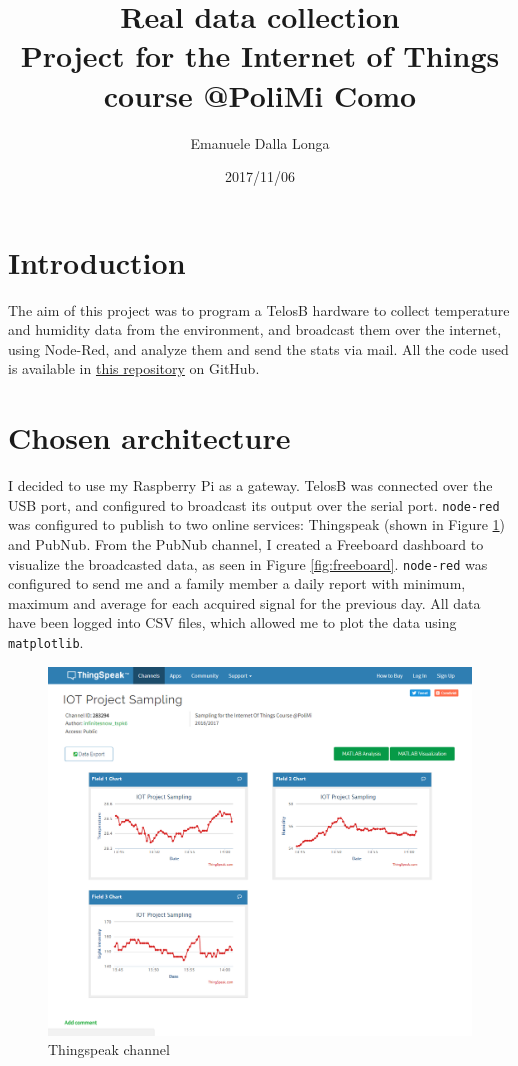 \documentclass[11pt]{article}
\title{\textbf{Real data collection}\\
				\large Project for the Internet of Things course @PoliMi Como}
\author{Emanuele Dalla Longa}
\date{2017/11/06}
\begin{document}
\maketitle

\section{Introduction}
The aim of this project was to program a TelosB hardware to collect temperature and humidity data from the environment, and broadcast them over the internet, using Node-Red, and analyze them and send the stats via mail. All the code used is available in \href{https://github.com/infinitesnow/IOT2016}{this repository} on GitHub.

\section{Chosen architecture}
I decided to use my Raspberry Pi as a gateway. TelosB was connected over the USB port, and configured to broadcast its output over the serial port. \texttt{node-red} was configured to publish to two online services: Thingspeak (shown in Figure \ref{fig:thingspeak}) and PubNub. From the PubNub channel, I created a Freeboard dashboard to visualize the broadcasted data, as seen in Figure \ref{fig:freeboard}. \texttt{node-red} was configured to send me and a family member a daily report with minimum, maximum and average for each acquired signal for the previous day. All data have been logged into CSV files, which allowed me to plot the data using \texttt{matplotlib}.

\begin{figure}
\includegraphics[width=\textwidth]{thingspeak}
\caption{Thingspeak channel}
\label{fig:thingspeak}
\end{figure}
\end{document}
